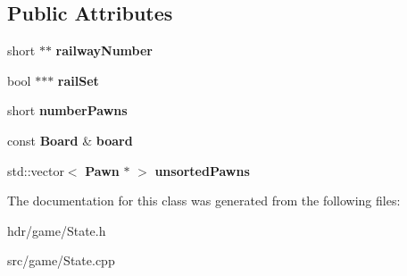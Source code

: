 \subsection*{Public Attributes}
\begin{DoxyCompactItemize}
\item 
short $\ast$$\ast$ {\bfseries railway\-Number}\label{class_state_aa894bfd06fe70d41f14527401d752bd6}

\item 
bool $\ast$$\ast$$\ast$ {\bfseries rail\-Set}\label{class_state_a06eec6ac8f191d3b7e6bfc85426e37c6}

\item 
short {\bfseries number\-Pawns}\label{class_state_a2bd881ff696f2807e54a4cc0b522f624}

\item 
const {\bf Board} \& {\bfseries board}\label{class_state_a74702298b35b8a798e85212bccff6daa}

\item 
std\-::vector$<$ {\bf Pawn} $\ast$ $>$ {\bfseries unsorted\-Pawns}\label{class_state_af75d24cbceb25a2cb35f6416bdc374eb}

\end{DoxyCompactItemize}


The documentation for this class was generated from the following files\-:\begin{DoxyCompactItemize}
\item 
hdr/game/State.\-h\item 
src/game/State.\-cpp\end{DoxyCompactItemize}
